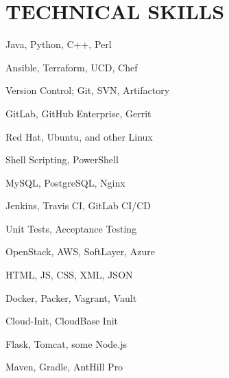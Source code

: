 \documentclass[]{dylan-resume}
\begin{document}
\begin{minipage}[t]{1.00\textwidth}

\section{TECHNICAL SKILLS}
\begin{center}
\begin{minipage}[b]{0.33333\textwidth}
\raggedright
Java, Python, C++, Perl \par
Ansible, Terraform, UCD, Chef \par
Version Control; Git, SVN, Artifactory \par
GitLab, GitHub Enterprise, Gerrit  \par
Red Hat, Ubuntu, and other Linux \par
\end{minipage}%
\begin{minipage}[b]{0.33333\textwidth}
\centering
Shell Scripting, PowerShell \par
MySQL, PostgreSQL, Nginx \par
Jenkins, Travis CI, GitLab CI/CD \par
Unit Tests, Acceptance Testing \par
OpenStack, AWS, SoftLayer, Azure 
\end{minipage}%
\begin{minipage}[b]{0.33333\textwidth}
\raggedleft
HTML, JS, CSS, XML, JSON \par
Docker, Packer, Vagrant, Vault \par
Cloud-Init, CloudBase Init \par
Flask, Tomcat, some Node.js \par
Maven, Gradle, AntHill Pro
\end{minipage}
\end{center}


\end{minipage}
\end{document}

